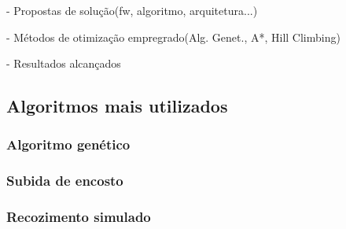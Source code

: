 - Propostas de solução(fw, algoritmo, arquitetura...)

- Métodos de otimização empregrado(Alg. Genet., A*, Hill Climbing)

- Resultados alcançados

\subsection{Algoritmos mais utilizados}

\subsubsection{Algoritmo genético}

\subsubsection{Subida de encosto}

\subsubsection{Recozimento simulado}







